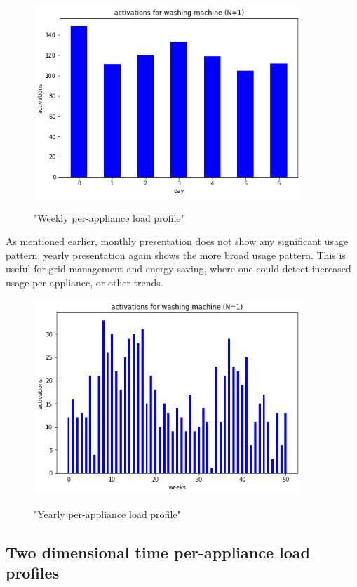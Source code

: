 \begin{figure}[H]
	\centering
	\caption{"Weekly per-appliance load profile"}
	\includegraphics[width=0.9\textwidth]{../Figures/LPS/WM_weekly.png}
	\label{fig:WM_weekly}
\end{figure}

As mentioned earlier, monthly presentation does not show any significant usage pattern,
yearly presentation again shows the more broad usage pattern.
This is useful for grid management and energy saving,
where one could detect increased usage per appliance, or other trends. 

\begin{figure}[H]
	\centering
	\caption{"Yearly per-appliance load profile"}
	\includegraphics[width=0.9\textwidth]{../Figures/LPS/WM_yearly.png}
	\label{fig:WM_yearly}
\end{figure}


\subsection{Two dimensional time per-appliance load profiles}

